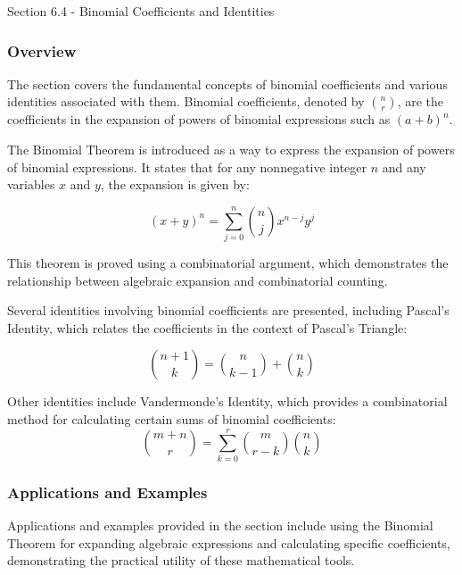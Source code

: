 \begin{notes}{Section 6.4 - Binomial Coefficients and Identities}
    \subsubsection*{Overview}

    The section covers the fundamental concepts of binomial coefficients and various identities associated with them. Binomial coefficients, denoted by $\binom{n}{r}$, are the coefficients in the 
    expansion of powers of binomial expressions such as $(a + b)^n$. \vspace*{1em}
    
    \begin{Highlight}
        The Binomial Theorem is introduced as a way to express the expansion of powers of binomial expressions. It states that for any nonnegative integer $ n $ and any variables $ x $ and $ y $, 
        the expansion is given by:
        
        \begin{equation*}
            (x + y)^n = \sum_{j=0}^{n} \binom{n}{j} x^{n-j} y^j
        \end{equation*}
        
        This theorem is proved using a combinatorial argument, which demonstrates the relationship between algebraic expansion and combinatorial counting.
    \end{Highlight}
    
    \begin{Highlight}
        Several identities involving binomial coefficients are presented, including Pascal's Identity, which relates the coefficients in the context of Pascal's Triangle:
        
        \begin{equation*}
            \binom{n+1}{k} = \binom{n}{k-1} + \binom{n}{k}
        \end{equation*}
        
        Other identities include Vandermonde's Identity, which provides a combinatorial method for calculating certain sums of binomial coefficients:
        \begin{equation*}
            \binom{m+n}{r} = \sum_{k=0}^{r} \binom{m}{r-k}\binom{n}{k}
        \end{equation*}
    \end{Highlight}
    
    \subsubsection*{Applications and Examples}
    Applications and examples provided in the section include using the Binomial Theorem for expanding algebraic expressions and calculating specific coefficients, demonstrating the practical utility 
    of these mathematical tools.
    

\end{notes}
